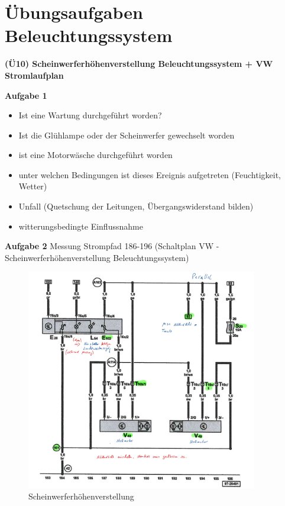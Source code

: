 \section{Übungsaufgaben
Beleuchtungssystem}\label{uebungsaufgaben-beleuchtungssystem}

\textbf{(Ü10) Scheinwerferhöhenverstellung Beleuchtungssystem + VW
Stromlaufplan}

\textbf{Aufgabe 1}

\begin{itemize}
\item
  Ist eine Wartung durchgeführt worden?
\item
  Ist die Glühlampe oder der Scheinwerfer gewechselt worden
\item
  ist eine Motorwäsche durchgeführt worden
\item
  unter welchen Bedingungen ist dieses Ereignis aufgetreten
  (Feuchtigkeit, Wetter)
\item
  Unfall (Quetschung der Leitungen, Übergangswiderstand bilden)
\item
  witterungsbedingte Einflussnahme
\end{itemize}

\textbf{Aufgabe 2} Messung Strompfad 186-196 (Schaltplan VW -
Scheinwerferhöhenverstellung Beleuchtungssystem)

\begin{figure}[!ht]%
\centering
\includegraphics[width=0.9\textwidth]{images/Skizze/28_Scheinwerferhoehenverstellung.pdf}
\caption{Scheinwerferhöhenverstellung}
\end{figure}

